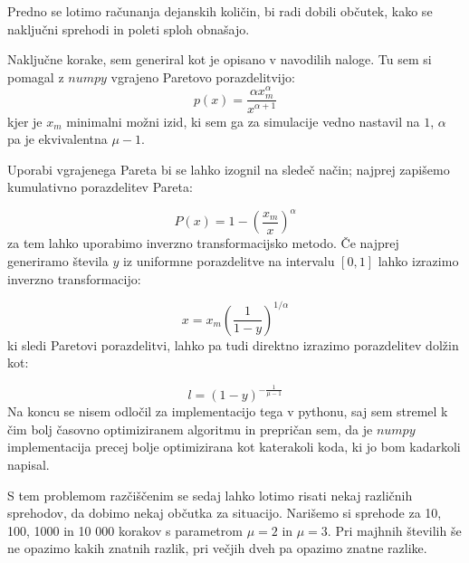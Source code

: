 \documentclass[slovene,11pt,a4paper]{article}
\begin{document}
Predno se lotimo računanja dejanskih količin, bi radi dobili občutek, kako se naključni sprehodi in poleti sploh obnašajo. 

Naključne korake, sem generiral kot je opisano v navodilih naloge. Tu sem si pomagal z $numpy$ vgrajeno Paretovo porazdelitvijo: 
$$
  p(x) = \frac{\alpha x_m^\alpha}{x^{\alpha + 1}}
$$
kjer je $x_m$ minimalni možni izid, ki sem ga za simulacije vedno nastavil na $1$, $\alpha$ pa je ekvivalentna $\mu - 1$.

Uporabi vgrajenega Pareta bi se lahko izognil na sledeč način; najprej zapišemo kumulativno porazdelitev Pareta:

$$
  P(x) = 1 - \left(\frac{x_m}{x}\right)^\alpha
$$
za tem lahko uporabimo inverzno transformacijsko metodo. Če najprej generiramo števila $y$ iz uniformne porazdelitve na intervalu $\left[0, 1\right]$ lahko izrazimo inverzno transformacijo:

$$
  x = x_m\left(\frac{1}{1 - y}\right)^{1/\alpha}
$$
ki sledi Paretovi porazdelitvi, lahko pa tudi direktno izrazimo porazdelitev dolžin kot:

$$
  l = (1 - y)^{-\frac{1}{\mu - 1}}
$$
Na koncu se nisem odločil za implementacijo tega v pythonu, saj sem stremel k čim bolj časovno optimiziranem algoritmu in prepričan sem, da je $numpy$ implementacija precej bolje optimizirana kot katerakoli koda, ki jo bom kadarkoli napisal.

S tem problemom razčiščenim se sedaj lahko lotimo risati nekaj različnih sprehodov, da dobimo nekaj občutka za situacijo. Narišemo si sprehode za 10, 100, 1000 in 10 000 korakov s parametrom $\mu = 2$ in $\mu = 3$. Pri majhnih številih še ne opazimo kakih znatnih razlik, pri večjih dveh pa opazimo znatne razlike.
\end{document}
